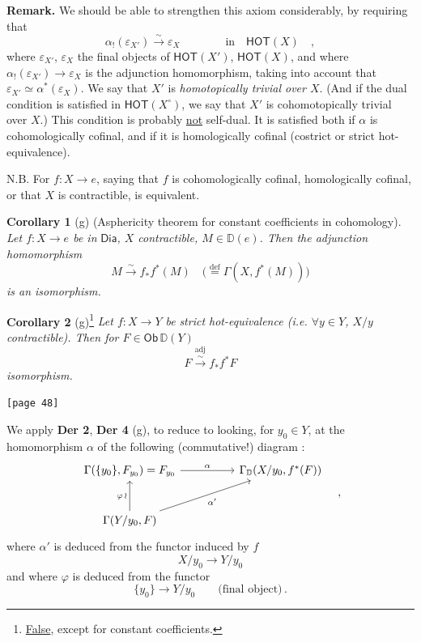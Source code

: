 \documentclass[11pt]{article}
\newcommand{\msp}[1]{\marginpar{\footnotesize [#1]}}
\newcommand{\D}{\mathbb{D}}
\newcommand{\Dia}{\mathsf{Dia}}
\newcommand{\HOT}{\mathsf{HOT}}
\newcommand{\Ob}{\mathsf{Ob}}
\begin{document}
\noindent\textbf{Remark.} We should be able to strengthen this axiom considerably, by requiring that
\[ \alpha_{!}(\varepsilon_{X'}) \xrightarrow{\sim} \varepsilon_{X} \qquad\qquad \text{in} \quad \HOT(X) \quad , \]
where $\varepsilon_{X'}$, $\varepsilon_{X}$ the final objects of $\HOT(X')$, $\HOT(X)$, and where $\alpha_{!}(\varepsilon_{X'}) \to \varepsilon_{X}$ is the adjunction homomorphism, taking into account that $\varepsilon_{X'} \simeq \alpha^{*}(\varepsilon_{X})$. We say that $X'$ is \textit{homotopically trivial over $X$}. (And if the dual condition is satisfied in $\HOT(X^{\circ})$, we say that $X'$ is cohomotopically trivial over $X$.) This condition is probably \underline{not} self-dual. It is satisfied both if $\alpha$ is cohomologically cofinal, and if it is homologically cofinal (costrict or strict hot-equivalence).

\noindent N.B. For $f : X \to e$, saying that $f$ is cohomologically cofinal, homologically cofinal, or that $X$ is contractible, is equivalent.

\noindent\textbf{Corollary 1} (g) (Asphericity theorem for constant coefficients in cohomology). \textit{Let $f : X \to e$ be in} $\Dia$\textit{, $X$ contractible, $M \in \D(e)$. Then the adjunction homomorphism}
\[ M \xrightarrow{\sim} f_{*} f^{*}(M) \quad \bigl(\overset{\text{def}}{=} \Gamma(X, f^{*}(M))\bigr) \]
\textit{is an isomorphism.}

\noindent\textbf{Corollary 2} (g)\footnote[16]{\underline{False}, except for constant coefficients.} \textit{Let $f : X \to Y$ be} \textit{strict hot-equivalence (i.e. $\forall y \in Y$, $X/y$ contractible). Then for $F \in \Ob\,\D(Y)$}
\[ F \overset{\text{adj}}{\xrightarrow{\sim}} f_{*} f^{*} F \]
 \textit{isomorphism.}

\noindent\msp{page 48}\texttt{[page 48]}

\noindent We apply \textbf{Der 2}, \textbf{Der 4} (g), to reduce to looking, for $y_{0} \in Y$, at the homomorphism $\alpha$ of the following (commutative!) diagram :
\[
\begin{tikzcd}[row sep=large, column sep=huge]
\Gamma(\{y_{0}\}, F_{y_{0}}) = F_{y_{0}} \arrow[r, "\alpha"] & \Gamma_{\D}(X/y_{0}, f^{*}(F)) \\
\Gamma(Y/y_{0}, F) \arrow[u, "\varphi\,\wr"] \arrow[ur, "\alpha'"'] &
\end{tikzcd}
\quad ,
\]
where $\alpha'$ is deduced from the functor induced by $f$
\[ X/y_{0} \longrightarrow Y/y_{0} \]
and where $\varphi$ is deduced from the functor
\[ \{y_{0}\} \longrightarrow Y/y_{0} \qquad \text{(final object)}\,. \]
\end{document}
